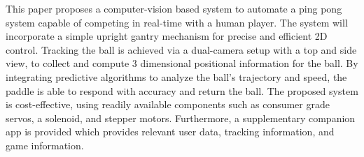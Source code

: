 This paper proposes a computer-vision based system to automate a ping pong system capable of competing in real-time with a human player. The system will incorporate a simple upright gantry mechanism for precise and efficient 2D control. Tracking the ball is achieved via a dual-camera setup with a top and side view, to collect and compute 3 dimensional positional information for the ball. By integrating predictive algorithms to analyze the ball's trajectory and speed, the paddle is able to respond with accuracy and return the ball. The proposed system is cost-effective, using readily available components such as consumer grade servos, a solenoid, and stepper motors. Furthermore, a supplementary companion app is provided which provides relevant user data, tracking information, and game information.